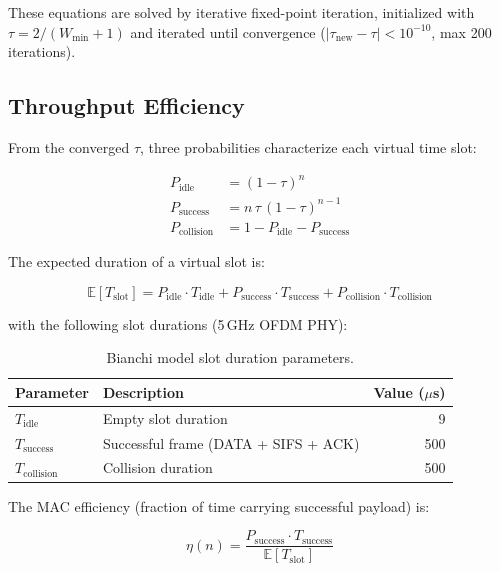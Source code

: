 \documentclass[11pt,letterpaper]{article}
\begin{document}
These equations are solved by iterative fixed-point iteration, initialized
with $\tau = 2/(W_{\min} + 1)$ and iterated until convergence
($|\tau_\text{new} - \tau| < 10^{-10}$, max 200 iterations).

\subsection{Throughput Efficiency}

From the converged $\tau$, three probabilities characterize each virtual
time slot:

\begin{align}
P_\text{idle}      &= (1 - \tau)^n \label{eq:p_idle} \\
P_\text{success}   &= n\,\tau\,(1 - \tau)^{n-1} \label{eq:p_success} \\
P_\text{collision} &= 1 - P_\text{idle} - P_\text{success} \label{eq:p_collision}
\end{align}

The expected duration of a virtual slot is:

\begin{equation}
\label{eq:eslot}
\mathbb{E}[T_\text{slot}] =
  P_\text{idle} \cdot T_\text{idle}
  + P_\text{success} \cdot T_\text{success}
  + P_\text{collision} \cdot T_\text{collision}
\end{equation}

with the following slot durations (5\,GHz OFDM PHY):

\begin{table}[h]
\centering
\caption{Bianchi model slot duration parameters.}
\label{tab:bianchi_slots}
\begin{tabular}{@{}llr@{}}
\toprule
\textbf{Parameter} & \textbf{Description} & \textbf{Value ($\mu$s)} \\
\midrule
$T_\text{idle}$      & Empty slot duration       & 9 \\
$T_\text{success}$   & Successful frame (DATA + SIFS + ACK) & 500 \\
$T_\text{collision}$ & Collision duration         & 500 \\
\bottomrule
\end{tabular}
\end{table}

The MAC efficiency (fraction of time carrying successful payload) is:

\begin{equation}
\label{eq:eta}
\eta(n) = \frac{P_\text{success} \cdot T_\text{success}}{\mathbb{E}[T_\text{slot}]}
\end{equation}
\end{document}
